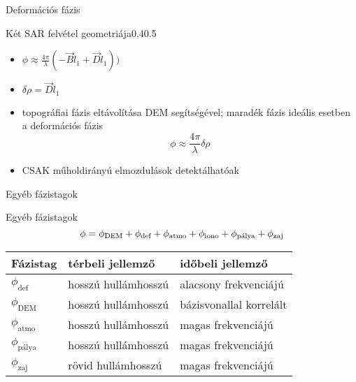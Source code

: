 \def\ft{Deformációs fázis}

\begin{frame}{\ft}
    \begin{figp}{}{Két SAR felvétel geometriája}{0.4}{0.5}
        \begin{itemize}
            \item $\phi \approx \frac{4\pi}{\lambda} (- \vec{B}\hat{l}_1 + \vec{D}\hat{l}_1))$
            \item $\delta\rho = \vec{D}\hat{l}_1$
            \item topográfiai fázis eltávolítása DEM segítségével; maradék fázis ideális esetben a deformációs fázis $$\phi \approx \frac{4\pi}{\lambda}\delta\rho$$
            \item CSAK műholdirányú elmozdulások detektálhatóak
        \end{itemize}
    \end{figp}
\end{frame}


\def\ft{Egyéb fázistagok}

\begin{frame}{\ft}
    \begin{minic}{0.75}
    \end{minic}
\end{frame}

\begin{frame}{\ft}
    $$ \phi = \phi_{\text{DEM}} + \phi_{\text{def}} + \phi_{\text{atmo}} + \phi_{\text{iono}} + \phi_{\text{pálya}} + \phi_{\text{zaj}} $$
    \begin{table}[H]
        \centering
        \begin{tabular}{l l l} \toprule
            Fázistag & térbeli jellemző & időbeli jellemző\\ \midrule
            $\phi_{\text{def}}$ & hosszú hullámhosszú & alacsony frekvenciájú\\
            $\phi_{\text{DEM}}$ & hosszú hullámhosszú & bázisvonallal korrelált \\
            $\phi_{\text{atmo}}$ & hosszú hullámhosszú & magas frekvenciájú\\
            $\phi_{\text{pálya}}$ & hosszú hullámhosszú & magas frekvenciájú \\
            $\phi_{\text{zaj}}$ & rövid hullámhosszú & magas frekvenciájú \\ \bottomrule
        \end{tabular}
    \end{table}
    \cite{Hooper2012}
\end{frame}
